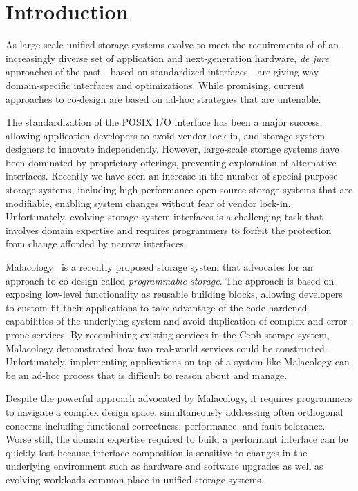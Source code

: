 \section{Introduction}
\label{sec:intro}

As large-scale unified storage systems evolve to meet the requirements of
of an increasingly diverse set of application and next-generation hardware,
\emph{de jure} approaches of the past---based on standardized interfaces---are
giving way domain-specific interfaces and optimizations. While promising,
current approaches to co-design are based on ad-hoc strategies that are
untenable.

The standardization of the POSIX I/O interface has been a major success,
allowing application developers to avoid vendor lock-in, and storage system
designers to innovate independently.
However, large-scale storage systems have been
dominated by proprietary offerings, preventing exploration of alternative
interfaces. Recently we have seen an increase
in the number of special-purpose storage systems, including high-performance
open-source storage systems that are modifiable, enabling system changes
without fear of vendor lock-in. Unfortunately, evolving storage system
interfaces is a challenging task that involves domain expertise and requires
programmers to forfeit the protection from change afforded by narrow
interfaces.

Malacology~\cite{sevilla:eurosys17} is a recently proposed storage system that
advocates for an approach to co-design called \emph{programmable storage}. The
approach is based on exposing low-level functionality as reusable building
blocks, allowing developers to custom-fit their applications to take advantage
of the code-hardened capabilities of the underlying system and avoid
duplication of complex and error-prone services. By recombining existing
services in the Ceph storage system, Malacology demonstrated how two
real-world services could be constructed. Unfortunately, implementing
applications on top of a system like Malacology can be an ad-hoc process
that is difficult to reason about and manage.

Despite the powerful approach advocated by Malacology, it requires programmers
to navigate a complex design space, simultaneously addressing often orthogonal
concerns including functional correctness, performance, and fault-tolerance.
Worse still, the domain expertise required to build a performant interface can
be quickly lost because interface composition is sensitive to changes in the
underlying environment such as hardware and software upgrades as well as
evolving workloads common place in unified storage systems.

